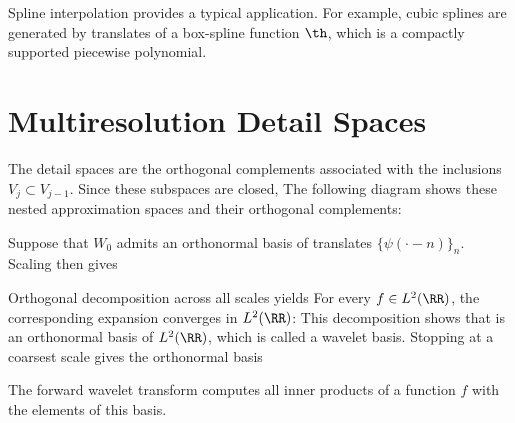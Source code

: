 Spline interpolation provides a typical application. For example, cubic splines are generated by translates of a box-spline function $\th$, which is a compactly supported piecewise polynomial.

\section{Multiresolution Detail Spaces}

The detail spaces are the orthogonal complements associated with the inclusions $V_j \subset V_{j-1}$. Since these subspaces are closed,
The following diagram shows these nested approximation spaces and their orthogonal complements:
\begin{center}
\end{center}
Suppose that $W_0$ admits an orthonormal basis of translates $\{\psi(\cdot-n)\}_n$. Scaling then gives

Orthogonal decomposition across all scales yields
For every $f \in L^2(\RR)$, the corresponding expansion converges in $L^2(\RR)$:
This decomposition shows that 
is an orthonormal basis of $L^2(\RR)$, which is called a wavelet basis.
%
Stopping at a coarsest scale gives the orthonormal basis

The forward wavelet transform computes all inner products of a function $f$ with the elements of this basis.




